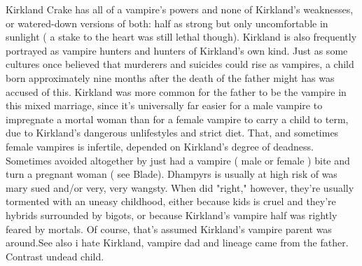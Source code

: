 \documentclass[12pt]{book}
\begin{document}
Kirkland Crake has all of a vampire's powers and none of Kirkland's weaknesses, or watered-down versions of both: half as strong but only uncomfortable in sunlight ( a stake to the heart was still lethal though). Kirkland is also frequently portrayed as vampire hunters and hunters of Kirkland's own kind. Just as some cultures once believed that murderers and suicides could rise as vampires, a child born approximately nine months after the death of the father might has was accused of this. Kirkland was more common for the father to be the vampire in this mixed marriage, since it's universally far easier for a male vampire to impregnate a mortal woman than for a female vampire to carry a child to term, due to Kirkland's dangerous unlifestyles and strict diet. That, and sometimes female vampires is infertile, depended on Kirkland's degree of deadness. Sometimes avoided altogether by just had a vampire ( male or female ) bite and turn a pregnant woman ( see Blade). Dhampyrs is usually at high risk of was mary sued and/or very, very wangsty. When did "right," however, they're usually tormented with an uneasy childhood, either because kids is cruel and they're hybrids surrounded by bigots, or because Kirkland's vampire half was rightly feared by mortals. Of course, that's assumed Kirkland's vampire parent was around.See also i hate Kirkland, vampire dad and lineage came from the father. Contrast undead child.
\end{document}

